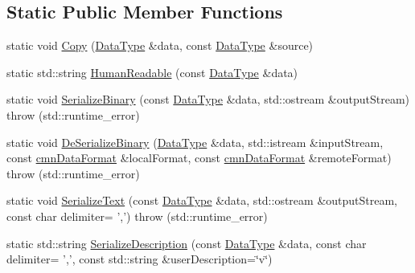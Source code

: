 \subsection*{Static Public Member Functions}
\begin{DoxyCompactItemize}
\item 
static void \hyperlink{classcmn_data_3_01vct_dynamic_vector_3_01__element_type_01_4_01_4_a0cb719326922e6b70028d52cdc4958e6}{Copy} (\hyperlink{classcmn_data_3_01vct_dynamic_vector_3_01__element_type_01_4_01_4_a00a493d9c26fcb200ced1375b3500d17}{Data\-Type} \&data, const \hyperlink{classcmn_data_3_01vct_dynamic_vector_3_01__element_type_01_4_01_4_a00a493d9c26fcb200ced1375b3500d17}{Data\-Type} \&source)
\item 
static std\-::string \hyperlink{classcmn_data_3_01vct_dynamic_vector_3_01__element_type_01_4_01_4_a6257dbc18f896f817b84acdf06ddd048}{Human\-Readable} (const \hyperlink{classcmn_data_3_01vct_dynamic_vector_3_01__element_type_01_4_01_4_a00a493d9c26fcb200ced1375b3500d17}{Data\-Type} \&data)
\item 
static void \hyperlink{classcmn_data_3_01vct_dynamic_vector_3_01__element_type_01_4_01_4_a960380b9c9996460445be898c6b3a7c4}{Serialize\-Binary} (const \hyperlink{classcmn_data_3_01vct_dynamic_vector_3_01__element_type_01_4_01_4_a00a493d9c26fcb200ced1375b3500d17}{Data\-Type} \&data, std\-::ostream \&output\-Stream)  throw (std\-::runtime\-\_\-error)
\item 
static void \hyperlink{classcmn_data_3_01vct_dynamic_vector_3_01__element_type_01_4_01_4_abb0f206b64a13f98f9f4b7c7b70cd634}{De\-Serialize\-Binary} (\hyperlink{classcmn_data_3_01vct_dynamic_vector_3_01__element_type_01_4_01_4_a00a493d9c26fcb200ced1375b3500d17}{Data\-Type} \&data, std\-::istream \&input\-Stream, const \hyperlink{classcmn_data_format}{cmn\-Data\-Format} \&local\-Format, const \hyperlink{classcmn_data_format}{cmn\-Data\-Format} \&remote\-Format)  throw (std\-::runtime\-\_\-error)
\item 
static void \hyperlink{classcmn_data_3_01vct_dynamic_vector_3_01__element_type_01_4_01_4_afb5f52a799301a9eb00575efee47ecf0}{Serialize\-Text} (const \hyperlink{classcmn_data_3_01vct_dynamic_vector_3_01__element_type_01_4_01_4_a00a493d9c26fcb200ced1375b3500d17}{Data\-Type} \&data, std\-::ostream \&output\-Stream, const char delimiter= ',')  throw (std\-::runtime\-\_\-error)
\item 
static std\-::string \hyperlink{classcmn_data_3_01vct_dynamic_vector_3_01__element_type_01_4_01_4_a4c047d9159d531c941d8938588da249e}{Serialize\-Description} (const \hyperlink{classcmn_data_3_01vct_dynamic_vector_3_01__element_type_01_4_01_4_a00a493d9c26fcb200ced1375b3500d17}{Data\-Type} \&data, const char delimiter= ',', const std\-::string \&user\-Description=\char`\"{}v\char`\"{})

\end{DoxyCompactItemize}
